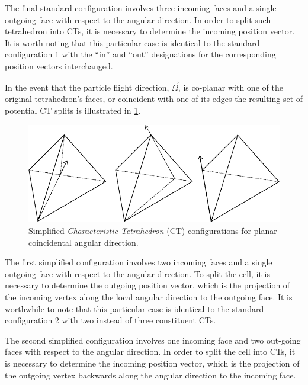 The final standard configuration involves three incoming faces and a single outgoing face with respect to the angular direction.
In order to split such tetrahedron into \ac{CT}s, it is necessary to determine the incoming position vector.
It is worth noting that this particular case is identical to the standard configuration 1 with the “in” and “out” designations for the corresponding position vectors interchanged.

In the event that the particle flight direction, $\vec{\Omega}$, is co-planar with one of the original tetrahedron's faces, or coincident with one of its edges the resulting set of potential \ac{CT} splits is illustrated in \ref{fig:planar_CTs}.

\begin{figure}[th]
  \includegraphics[width=1.0\textwidth]{chapters/theory/figures/CT_simplified.pdf}
  \caption{Simplified \textit{Characteristic Tetrahedron} (\ac{CT}) configurations for planar coincidental angular direction.}
  \label{fig:planar_CTs}
\end{figure}

The first simplified configuration involves two incoming faces and a single outgoing face with respect to the angular direction.
To split the cell, it is necessary to determine the outgoing position vector, which is the projection of the incoming vertex along the local angular direction to the outgoing face.
It is worthwhile to note that this particular case is identical to the standard configuration 2 with two instead of three constituent \ac{CT}s.

The second simplified configuration involves one incoming face and two out-going faces with respect to the angular direction.
In order to split the cell into \ac{CT}s, it is necessary to determine the incoming position vector, which is the projection of the outgoing vertex backwards along the angular direction to the incoming face.

